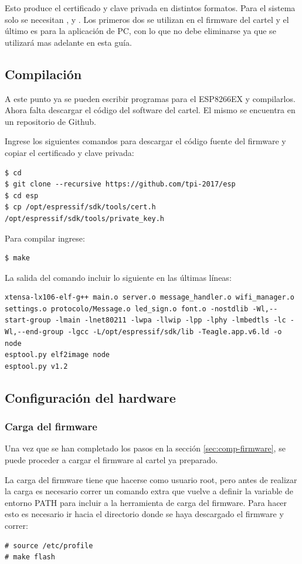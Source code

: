 Esto produce el certificado y clave privada en distintos formatos. Para el sistema solo se necesitan ,  y . Los primeros dos se utilizan en el firmware del cartel y el último es para la aplicación de PC, con lo que no debe eliminarse ya que se utilizará mas adelante en esta guía.

\subsection{Compilación}
A este punto ya se pueden escribir programas para el ESP8266EX y compilarlos. Ahora falta descargar el código del software del cartel. El mismo se encuentra en un repositorio de Github.


Ingrese los siguientes comandos para descargar el código fuente del firmware y copiar el certificado y clave privada:

\begin{lstlisting}
$ cd
$ git clone --recursive https://github.com/tpi-2017/esp
$ cd esp
$ cp /opt/espressif/sdk/tools/cert.h /opt/espressif/sdk/tools/private_key.h 
\end{lstlisting}

Para compilar ingrese:
\begin{lstlisting}
$ make
\end{lstlisting}

La salida del comando  incluir lo siguiente en las últimas líneas:
\begin{lstlisting}
xtensa-lx106-elf-g++ main.o server.o message_handler.o wifi_manager.o settings.o protocolo/Message.o led_sign.o font.o -nostdlib -Wl,--start-group -lmain -lnet80211 -lwpa -llwip -lpp -lphy -lmbedtls -lc -Wl,--end-group -lgcc -L/opt/espressif/sdk/lib -Teagle.app.v6.ld -o node
esptool.py elf2image node
esptool.py v1.2
\end{lstlisting}

\subsection{Configuración del hardware}
\subsubsection{Carga del firmware}
Una vez que se han completado los pasos en la sección \ref{sec:comp-firmware}, se puede proceder a cargar el firmware al cartel ya preparado.

La carga del firmware tiene que hacerse como usuario root, pero antes de realizar la carga es necesario correr un comando extra que vuelve a definir la variable de entorno PATH para incluir a la herramienta de carga del firmware.
Para hacer esto es necesario ir hacia el directorio donde se haya descargado el firmware y correr:
\begin{lstlisting}
# source /etc/profile
# make flash
\end{lstlisting}

